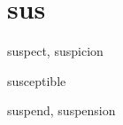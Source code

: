\chapter{sus}

\begin{word}{suspect, suspicion}
\end{word}

\begin{word}{susceptible}
\end{word}

\begin{word}{suspend, suspension}
\end{word}

